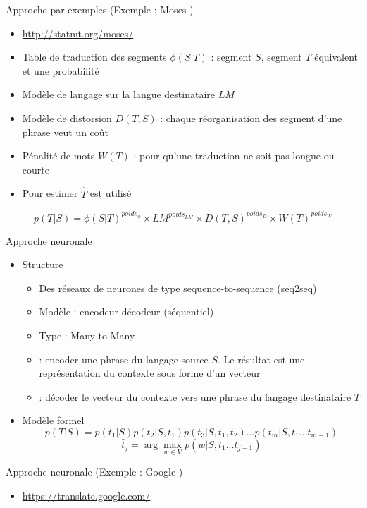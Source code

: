 \documentclass{KodeBook}
\begin{document}
Approche par exemples (Exemple : Moses \cite{07-koehn-al})

\begin{itemize}
	\item \url{http://statmt.org/moses/}
	\item Table de traduction des segments $\phi(S|T)$ : segment $S$, segment $T$ équivalent et une probabilité
	\item Modèle de langage sur la langue destinataire $LM$
	\item Modèle de distorsion $ D(T, S) $ : chaque réorganisation des segment d'une phrase veut un coût 
	\item Pénalité de mots $W(T)$ : pour qu'une traduction ne soit pas longue ou courte
	\item Pour estimer $\hat{T}$  est utilisé
\end{itemize}

\[p(T|S) = \phi(S|T)^{poids_{\phi}} \times LM^{poids_{LM}} \times D(T, S)^{poids_{D}} \times W(T)^{poids_{W}}\]

Approche neuronale

\begin{itemize}
	\item Structure
	\begin{itemize}
		\item Des réseaux de neurones de type sequence-to-sequence (seq2seq)
		\item Modèle : encodeur-décodeur (séquentiel)
		\item Type : Many to Many 
		\item {} : encoder une phrase du langage source $S$. Le résultat est une représentation du contexte sous forme d'un vecteur
		\item {} : décoder le vecteur du contexte vers une phrase du langage destinataire $T$
	\end{itemize}
	
	\item Modèle formel 
	\[ p(T|S) = p(t_1|S) p(t_2|S, t_1) p(t_3|S, t_1, t_2)\ldots p(t_m|S, t_1\ldots t_{m-1}) \]
	\[\hat{t}_j = \arg\max_{w \in V} p(w | S, t_1\ldots t_{j-1})\]
\end{itemize}

Approche neuronale (Exemple : Google \cite{16-wu-al} )

\begin{itemize}
	\item \url{https://translate.google.com/}
\end{itemize}
\begin{center}
\end{center}
\end{document}
